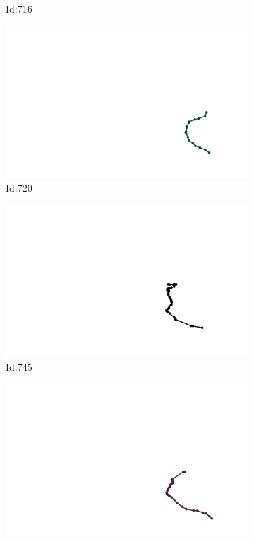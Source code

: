 \documentclass[12pt,twoside]{report}
\begin{document}
\begin{figure}
\begin{subfigure}[b]{0.20\textwidth}
\caption{Id:716}
\end{subfigure}
\begin{subfigure}[b]{0.20\textwidth}
\centering
\includegraphics[width=\textwidth]{../trajectories/720.png}
\caption{Id:720}
\end{subfigure}
\begin{subfigure}[b]{0.20\textwidth}
\centering
\includegraphics[width=\textwidth]{../trajectories/745.png}
\caption{Id:745}
\end{subfigure}
\begin{subfigure}[b]{0.20\textwidth}
\centering
\includegraphics[width=\textwidth]{../trajectories/746.png}

\end{subfigure}
\end{figure}
\end{document}
